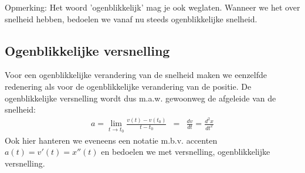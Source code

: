 \documentclass{ximera}
\begin{document}
	Opmerking: Het woord 'ogenblikkelijk' mag je ook weglaten. Wanneer we het over snelheid hebben, bedoelen we vanaf nu steeds ogenblikkelijke snelheid.
	
	\subsection{Ogenblikkelijke versnelling}
	
	Voor een ogenblikkelijke verandering van de snelheid maken we eenzelfde redenering als voor de ogenblikkelijke verandering van de positie. De ogenblikkelijke versnelling wordt dus m.a.w. gewoonweg de afgeleide van de snelheid:
	\begin{eqnarray*}
	a=\lim_{t\to t_0}\frac{v(t)-v(t_0)}{t-t_0}&=&\frac{dv}{dt}=\frac{d^2x}{dt^2}
	\end{eqnarray*}
	Ook hier hanteren we eveneens een notatie m.b.v. accenten $a(t)=v'(t)=x''(t)$ en bedoelen we met versnelling, ogenblikkelijke versnelling.
	
	
	
\end{document}
